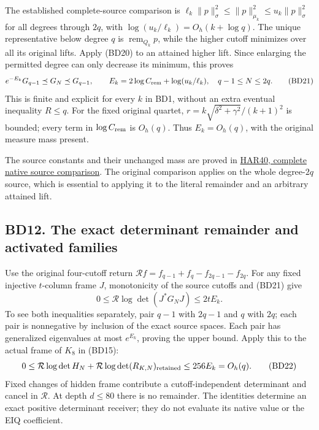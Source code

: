 \documentclass[11pt]{article}
\begin{document}
The established complete-source comparison is \(\ell_k\|p\|_\sigma^2\le\|p\|_{\mu_k}^2\le u_k\|p\|_\sigma^2\) for all degrees through \(2q\), with \(\log(u_k/\ell_k)=O_h(k+\log q)\). The unique representative below degree \(q\) is \(\operatorname{rem}_{Q_k}p\), while the higher cutoff minimizes over all its original lifts. Apply (BD20) to an attained higher lift. Since enlarging the permitted degree can only decrease its minimum, this proves \[
e^{-E_k}G_{q-1}\preceq G_N\preceq G_{q-1},\qquad
E_k=2\log C_{\rm rem}+\log(u_k/\ell_k),\quad q-1\le N\le2q. \tag{BD21}
\] This is finite and explicit for every \(k\) in BD1, without an extra eventual inequality \(R\le q\). For the fixed original quartet, \(r=k\sqrt{\delta^2+\gamma^2}/(k+1)^2\) is bounded; every term in \(\log C_{\rm rem}\) is \(O_h(q)\). Thus \(E_k=O_h(q)\), with the original measure mass present.

The source constants and their unchanged mass are proved in \href{https://github.com/KokunoYumeto/zeta-function-research-reader/blob/13ca9b136fcdae48df7454bd9bf99e1ef22dd03c/workbenches/splitzero-tandem/continuations/20260922-original-growth-resolvent/RETAINED_COMPLETE_PROOF_SOURCES.tex\#L296138}{HAR40, complete native source comparison}. The original comparison applies on the whole degree-\(2q\) source, which is essential to applying it to the literal remainder and an arbitrary attained lift.

\subsection{BD12. The exact determinant remainder and activated families}\label{bd12.-the-exact-determinant-remainder-and-activated-families}

Use the original four-cutoff return \(\mathcal Rf=f_{q-1}+f_q-f_{2q-1}-f_{2q}\). For any fixed injective \(t\)-column frame \(J\), monotonicity of the source cutoffs and (BD21) give \[
0\le\mathcal R\log\det(J^*G_NJ)\le2tE_k.
\] To see both inequalities separately, pair \(q-1\) with \(2q-1\) and \(q\) with \(2q\); each pair is nonnegative by inclusion of the exact source spaces. Each pair has generalized eigenvalues at most \(e^{E_k}\), proving the upper bound. Apply this to the actual frame of \(K_8\) in (BD15): \[
0\le\mathcal R\log\det H_N+
\mathcal R\log\det(R_{K,N})_{\rm retained}
\le256E_k=O_h(q). \tag{BD22}
\] Fixed changes of hidden frame contribute a cutoff-independent determinant and cancel in \(\mathcal R\). At depth \(d\le80\) there is no remainder. The identities determine an exact positive determinant receiver; they do not evaluate its native value or the EIQ coefficient.
\end{document}
